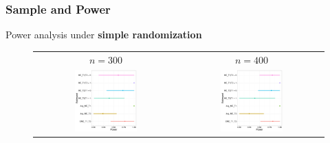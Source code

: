 \documentclass{beamer}\usepackage[]{graphicx}\usepackage[]{color}
\begin{document}
\begin{frame}\frametitle{Sample and Power}
Power analysis under \textbf{simple randomization}
    
\begin{figure}[htbp]
	\centering
\begin{table}
	\begin{tabular}{cc}
	$n=300$	& $n=400$  \\
	\includegraphics[width=0.45\textwidth]{power300}	& \includegraphics[width=0.45\textwidth]{power400}  \\
	\end{tabular}
\end{table}
\end{figure}
    
\end{frame}
\end{document}
